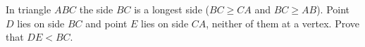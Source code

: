 In triangle $ABC$ the side $BC$ is a longest side ($BC\ge CA$ and $BC\ge AB$). Point $D$ lies on side $BC$ and point $E$ lies on side $CA$, neither of them at a vertex. Prove that $DE<BC$.
